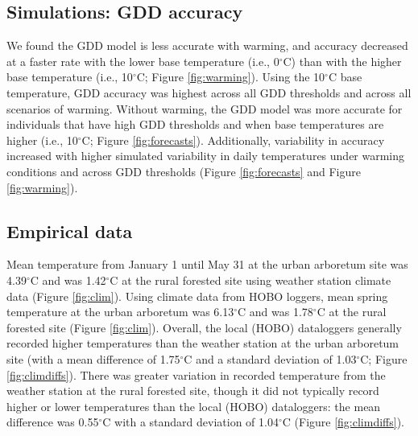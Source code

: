 \documentclass{article}\usepackage[]{graphicx}\usepackage[]{color}
\begin{document}
\subsection{Simulations: GDD accuracy}
We found the GDD model is less accurate with warming, and accuracy decreased at a faster rate with the lower base temperature (i.e., 0$^{\circ}$C) than with the higher base temperature (i.e., 10$^{\circ}$C; Figure \ref{fig:warming}). Using the 10$^{\circ}$C base temperature, GDD accuracy was highest across all GDD thresholds and across all scenarios of warming. Without warming, the GDD model was more accurate for individuals that have high GDD thresholds and when base temperatures are higher (i.e., 10$^{\circ}$C; Figure \ref{fig:forecasts}). Additionally, variability in accuracy increased with higher simulated variability in daily temperatures under warming conditions and across GDD thresholds (Figure \ref{fig:forecasts} and Figure \ref{fig:warming}).

\subsection{Empirical data} 
Mean temperature from January 1 until May 31 at the urban arboretum site was 4.39$^{\circ}$C and was 1.42$^{\circ}$C at the rural forested site using weather station climate data (Figure \ref{fig:clim}). Using climate data from HOBO loggers, mean spring temperature at the urban arboretum was 6.13$^{\circ}$C and was 1.78$^{\circ}$C at the rural forested site (Figure \ref{fig:clim}). Overall, the local (HOBO) dataloggers generally recorded higher temperatures than the weather station at the urban arboretum site (with a mean difference of 1.75$^{\circ}$C and a standard deviation of 1.03$^{\circ}$C; Figure \ref{fig:climdiffs}). There was greater variation in recorded temperature from the weather station at the rural forested site, though it did not typically record higher or lower temperatures than the local (HOBO) dataloggers: the mean difference was 0.55$^{\circ}$C with a standard deviation of 1.04$^{\circ}$C (Figure \ref{fig:climdiffs}). 
\end{document}

